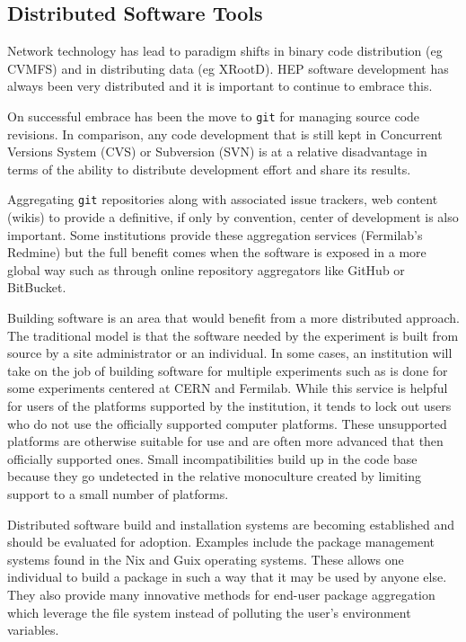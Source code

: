 \subsection{Distributed Software Tools}

Network technology has lead to paradigm shifts in binary code
distribution (eg CVMFS) and in distributing data (eg XRootD).  HEP
software development has always been very distributed and it is
important to continue to embrace this.

On successful embrace has been the move to \texttt{git} for managing source
code revisions.  In comparison, any code development that is still
kept in Concurrent Versions System (CVS) or Subversion (SVN) is at a
relative disadvantage in terms of the ability to distribute
development effort and share its results.

Aggregating \texttt{git} repositories along with associated issue trackers, web
content (wikis) to provide a definitive, if only by convention, center
of development is also important.  Some institutions provide these
aggregation services (Fermilab's Redmine) but the full benefit comes
when the software is exposed in a more global way such as through
online repository aggregators like GitHub or BitBucket.

Building software is an area that would benefit from a more
distributed approach.  The traditional model is that the software
needed by the experiment is built from source by a site administrator
or an individual.  In some cases, an institution will take on the job
of building software for multiple experiments such as is done for some
experiments centered at CERN and Fermilab.  While this service is
helpful for users of the platforms supported by the institution, it
tends to lock out users who do not use the officially supported
computer platforms.  These unsupported platforms are otherwise
suitable for use and are often more advanced that then officially
supported ones.  Small incompatibilities build up in the code base
because they go undetected in the relative monoculture created by
limiting support to a small number of platforms.

Distributed software build and installation systems are becoming
established and should be evaluated for adoption.  Examples include
the package management systems found in the Nix and Guix operating
systems.  These allows one individual to build a package in such a way
that it may be used by anyone else.  They also provide many innovative
methods for end-user package aggregation which leverage the file
system instead of polluting the user's environment variables.

